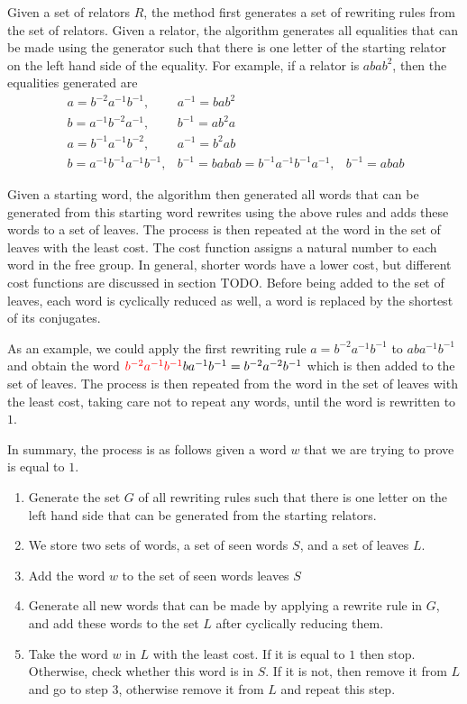 \documentclass[11pt]{article} %
\theoremstyle{definition}
\theoremstyle{definition}
\theoremstyle{definition}
\theoremstyle{definition}
\theoremstyle{definition}
\theoremstyle{definition}
\begin{document}
  Given a set of relators $R$, the method first generates a set of rewriting rules
  from the set of relators. Given a relator, the algorithm generates all equalities
  that can be made using the generator such that there is one letter of the starting
  relator on the left hand side of the equality.
  For example, if a relator is $abab^2$, then the equalities generated are
  \begin{equation}\
    \begin{aligned}
      a = b^{-2}a^{-1}b^{-1}, & a^{-1} = bab^2 \\
      b = a^{-1}b^{-2}a^{-1}, & b^{-1} = ab^2a \\
      a=b^{-1}a^{-1}b^{-2}, & a^{-1}=b^2ab \\
      b=a^{-1}b^{-1}a^{-1}b^{-1}, & b^{-1} = baba
      b=b^{-1}a^{-1}b^{-1}a^{-1},& b^{-1} = abab
    \end{aligned}
  \end{equation}

  Given a starting word, the algorithm then generated all words that can be generated
  from this starting word rewrites using the above rules and adds these
  words to a set of leaves. The process is then repeated at the word in the set of
  leaves with the least cost. The cost function assigns a natural number to each word in
  the free group. In general, shorter words have a lower cost, but different cost functions
  are discussed in section TODO. Before being added to the set of leaves, each word is cyclically
  reduced as well, a word is replaced by the shortest of its conjugates.

  As an example, we could apply the first rewriting rule $a = b^{-2}a^{-1}b^{-1}$
  to $aba^{-1}b^{-1}$ and obtain the word
  $\color{red}b^{-2}a^{-1}b^{-1}\color{black}ba^{-1}b^{-1} =
  b^{-2}a^{-2}b^{-1}$ which is then added to the set of leaves. The process
  is then repeated from the word in the set of leaves with the least cost, taking care
  not to repeat any words, until the word is rewritten to $1$.

  In summary, the process is as follows given a word $w$ that we are trying to prove is equal
  to $1$.
  \begin{enumerate}
    \item Generate the set $G$ of all rewriting rules such that there is one letter on the
      left hand side that can be generated from the starting relators.
    \item We store two sets of words, a set of seen words $S$, and a set of leaves $L$.
    \item Add the word $w$ to the set of seen words leaves $S$
    \item Generate all new words that can be made by applying a rewrite rule in $G$,
      and add these words to the set $L$ after cyclically reducing them.
    \item Take the word $w$ in $L$ with the least cost.
      If it is equal to $1$ then stop. Otherwise, check whether this
      word is in $S$. If it is not, then remove
      it from $L$ and go to step 3, otherwise remove it from $L$ and repeat this step.
  \end{enumerate}
\end{document}
